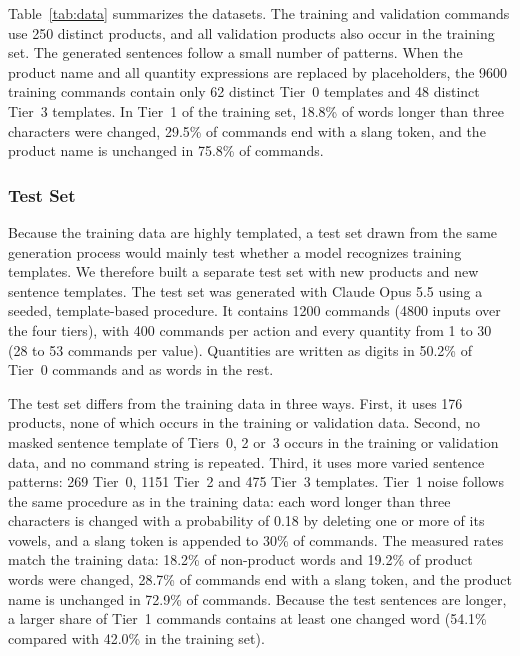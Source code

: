 \documentclass[journal,article,submit,pdftex,moreauthors]{Definitions/mdpi}
\begin{document}
Table~\ref{tab:data} summarizes the datasets. The training and validation commands use 250 distinct products, and all validation products also occur in the training set. The generated sentences follow a small number of patterns. When the product name and all quantity expressions are replaced by placeholders, the 9600 training commands contain only 62 distinct Tier~0 templates and 48 distinct Tier~3 templates. In Tier~1 of the training set, 18.8\% of words longer than three characters were changed, 29.5\% of commands end with a slang token, and the product name is unchanged in 75.8\% of commands.

\subsubsection{Test Set}\label{sec:data-test}

Because the training data are highly templated, a test set drawn from the same generation process would mainly test whether a model recognizes training templates. We therefore built a separate test set with new products and new sentence templates. The test set was generated with Claude Opus 5.5 using a seeded, template-based procedure. It contains 1200 commands (4800 inputs over the four tiers), with 400 commands per action and every quantity from 1 to 30 (28 to 53 commands per value). Quantities are written as digits in 50.2\% of Tier~0 commands and as words in the rest.

The test set differs from the training data in three ways. First, it uses 176 products, none of which occurs in the training or validation data. Second, no masked sentence template of Tiers~0, 2 or~3 occurs in the training or validation data, and no command string is repeated. Third, it uses more varied sentence patterns: 269 Tier~0, 1151 Tier~2 and 475 Tier~3 templates. Tier~1 noise follows the same procedure as in the training data: each word longer than three characters is changed with a probability of 0.18 by deleting one or more of its vowels, and a slang token is appended to 30\% of commands. The measured rates match the training data: 18.2\% of non-product words and 19.2\% of product words were changed, 28.7\% of commands end with a slang token, and the product name is unchanged in 72.9\% of commands. Because the test sentences are longer, a larger share of Tier~1 commands contains at least one changed word (54.1\% compared with 42.0\% in the training set).
\end{document}
